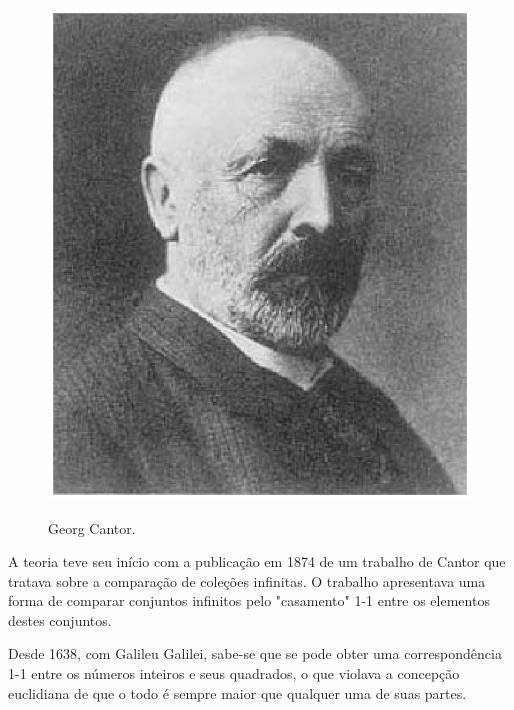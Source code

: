 \documentclass[a4paper,12pt]{report}
\begin{document}
{%


\begin{figure}[!htb]
\centering
  \includegraphics[scale=0.8]{cantor.eps}\\
  \vspace{-0.5cm}
  \caption{Georg Cantor.}\label{}
\end{figure}


A teoria teve seu início com a publicação em 1874 de um trabalho
de Cantor que tratava sobre a comparação de coleções infinitas. O
trabalho apresentava uma forma de comparar conjuntos infinitos
pelo "casamento" 1-1 entre os elementos destes
conjuntos.\vskip0.3cm

Desde 1638, com Galileu Galilei, sabe-se que se pode obter uma
correspondência 1-1 entre os números inteiros e seus quadrados, o
que violava a concepção euclidiana de que o todo é sempre maior
que qualquer uma de suas partes.\vskip0.3cm

}
\end{document}
